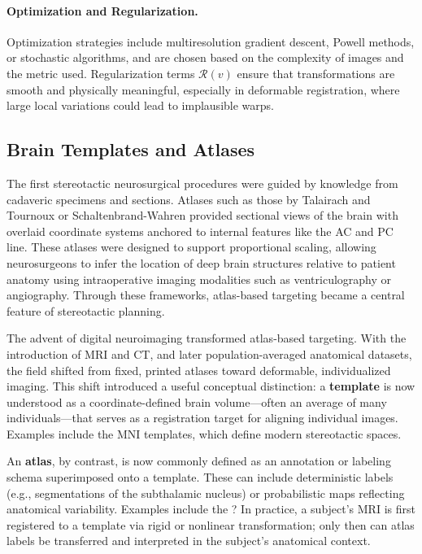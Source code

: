 \paragraph{Optimization and Regularization.}
Optimization strategies include multiresolution gradient descent, Powell methods, or stochastic algorithms, and are chosen based on the complexity of images and the metric used. Regularization terms \( \mathcal{R}(v) \) ensure that transformations are smooth and physically meaningful, especially in deformable registration, where large local variations could lead to implausible warps.

\subsection{Brain Templates and Atlases}
\label{sec:atlases_templates}
The first stereotactic neurosurgical procedures were guided by knowledge from cadaveric specimens and sections. Atlases such as those by Talairach and Tournoux \cite{Talairach1957-eb,Talairach1988-wk} or Schaltenbrand-Wahren \cite{Schaltenbrand1977-ge} provided sectional views of the brain with overlaid coordinate systems anchored to internal features like the AC and PC line. These atlases were designed to support proportional scaling, allowing neurosurgeons to infer the location of deep brain structures relative to patient anatomy using intraoperative imaging modalities such as ventriculography or angiography. Through these frameworks, atlas-based targeting became a central feature of stereotactic planning.

The advent of digital neuroimaging transformed atlas-based targeting. With the introduction of MRI and CT, and later population-averaged anatomical datasets, the field shifted from fixed, printed atlases toward deformable, individualized imaging. This shift introduced a useful conceptual distinction: a \textbf{template} is now understood as a coordinate-defined brain volume—often an average of many individuals—that serves as a registration target for aligning individual images. Examples include the MNI templates, which define modern stereotactic spaces.

An \textbf{atlas}, by contrast, is now commonly defined as an annotation or labeling schema superimposed onto a template. These can include deterministic labels (e.g., segmentations of the subthalamic nucleus) or probabilistic maps reflecting anatomical variability. Examples include the ? In practice, a subject's MRI is first registered to a template via rigid or nonlinear transformation; only then can atlas labels be transferred and interpreted in the subject's anatomical context.

